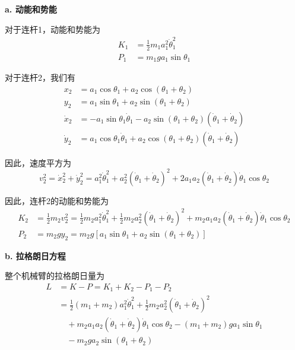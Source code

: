 \documentclass[12pt,a4paper]{ctexart}
\begin{document}
\textbf{a. 动能和势能}

对于连杆1，动能和势能为
\begin{align}
K_1 &= \frac{1}{2}m_1a_1^2\dot{\theta}_1^2 \\
P_1 &= m_1ga_1\sin\theta_1
\end{align}

对于连杆2，我们有
\begin{align}
x_2 &= a_1\cos\theta_1 + a_2\cos(\theta_1+\theta_2) \\
y_2 &= a_1\sin\theta_1 + a_2\sin(\theta_1+\theta_2) \\
\dot{x}_2 &= -a_1\sin\theta_1\dot{\theta}_1 - a_2\sin(\theta_1+\theta_2)(\dot{\theta}_1+\dot{\theta}_2) \\
\dot{y}_2 &= a_1\cos\theta_1\dot{\theta}_1 + a_2\cos(\theta_1+\theta_2)(\dot{\theta}_1+\dot{\theta}_2)
\end{align}

因此，速度平方为
\begin{equation}
v_2^2 = \dot{x}_2^2 + \dot{y}_2^2 = a_1^2\dot{\theta}_1^2 + a_2^2(\dot{\theta}_1+\dot{\theta}_2)^2 + 2a_1a_2(\dot{\theta}_1+\dot{\theta}_2)\dot{\theta}_1\cos\theta_2
\end{equation}

因此，连杆2的动能和势能为
\begin{align}
K_2 &= \frac{1}{2}m_2v_2^2 = \frac{1}{2}m_2a_1^2\dot{\theta}_1^2 + \frac{1}{2}m_2a_2^2(\dot{\theta}_1+\dot{\theta}_2)^2 + m_2a_1a_2(\dot{\theta}_1+\dot{\theta}_2)\dot{\theta}_1\cos\theta_2 \\
P_2 &= m_2gy_2 = m_2g[a_1\sin\theta_1 + a_2\sin(\theta_1+\theta_2)]
\end{align}

\textbf{b. 拉格朗日方程}

整个机械臂的拉格朗日量为
\begin{align}
L &= K - P = K_1 + K_2 - P_1 - P_2 \\
&= \frac{1}{2}(m_1+m_2)a_1^2\dot{\theta}_1^2 + \frac{1}{2}m_2a_2^2(\dot{\theta}_1+\dot{\theta}_2)^2 \\
&\quad + m_2a_1a_2(\dot{\theta}_1+\dot{\theta}_2)\dot{\theta}_1\cos\theta_2 - (m_1+m_2)ga_1\sin\theta_1 \\
&\quad - m_2ga_2\sin(\theta_1+\theta_2)
\end{align}
\end{document}
